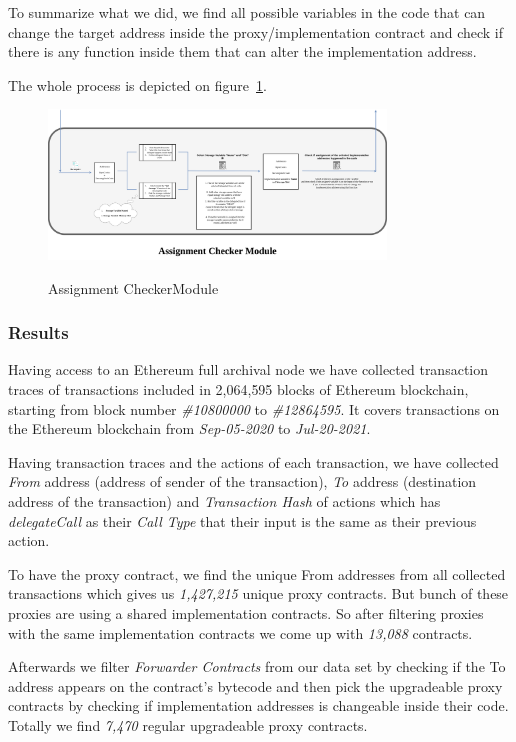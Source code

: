 To summarize what we did, we find all possible variables in the code that can change the target address inside the proxy/implementation contract and check if there is any function inside them that can alter the implementation address.

The whole process is depicted on figure~\ref{assignmentFinder}.

\begin{figure}[t]
  \includegraphics[width=0.8\textwidth]{figures/Assignment_finder.png}\label{assignmentFinder}
  \caption{Assignment CheckerModule}
\end{figure}



\subsubsection{Results}
Having access to an Ethereum full archival node we have collected transaction traces of transactions included in 2,064,595 blocks of Ethereum blockchain, starting from block number \textit{\#10800000} to \textit{\#12864595}. It covers transactions on the Ethereum blockchain from \textit{Sep-05-2020} to \textit{Jul-20-2021}. 

Having transaction traces and the actions of each transaction, we have collected \textit{From} address (address of sender of the transaction), \textit{To} address (destination address of the transaction) and \textit{Transaction Hash} of actions which has \textit{delegateCall} as their \textit{Call Type} that their input is the same as their previous action.

To have the proxy contract, we find the unique From addresses from all collected transactions which gives us \textit{1,427,215} unique proxy contracts. But bunch of these proxies are using a shared implementation contracts. So after filtering proxies with the same implementation contracts we come up with \textit{13,088} contracts.

Afterwards we filter \textit{Forwarder Contracts} from our data set by checking if the To address appears on the contract's bytecode and then pick the upgradeable proxy contracts by checking if implementation addresses is changeable inside their code. Totally we find \textit{7,470} regular upgradeable proxy contracts. 

